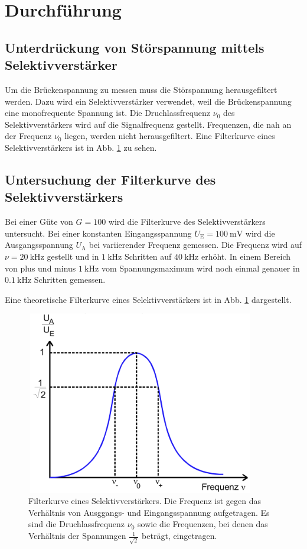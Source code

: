 \section{Durchführung}
\label{sec:Durchführung}

\subsection{Unterdrückung von Störspannung mittels Selektivverstärker}
Um die Brückenspannung zu messen muss die Störspannung herausgefiltert werden. 
Dazu wird ein Selektivverstärker verwendet, weil
die Brückenspannung eine monofrequente Spannung ist. Die Druchlassfrequenz $\nu_0$ des 
Selektivverstärkers wird auf die Signalfrequenz gestellt. 
Frequenzen, die nah an der Frequenz $\nu_0$ liegen, werden nicht herausgefiltert.
Eine Filterkurve eines Selektivverstärkers ist in Abb. \ref{abb:filterkurve} zu sehen.


\subsection{Untersuchung der Filterkurve des Selektivverstärkers}
Bei einer Güte von $G = \num{100}$ wird die Filterkurve des Selektivverstärkers
untersucht. Bei einer konstanten Eingangsspannung $U_\text{E} = \SI{100}{\milli\volt}$
wird die Ausgangsspannung $U_\text{A}$ bei variierender Frequenz gemessen.
Die Frequenz wird auf $\nu = \SI{20}{\kilo\hertz}$ gestellt und in $\SI{1}{\kilo\hertz}$
Schritten auf $\SI{40}{\kilo\hertz}$ erhöht. In einem Bereich von plus und minus 
$\SI{1}{\kilo\hertz}$ vom Spannungsmaximum wird noch einmal genauer in $\SI{0.1}{\kilo\hertz}$
Schritten gemessen.

\noindent Eine theoretische Filterkurve eines Selektivverstärkers ist in Abb. 
\ref{abb:filterkurve} dargestellt.

\begin{figure}
    \centering
    \includegraphics[width=10cm, height=8cm]{build/filterkurve.png}
    \caption{Filterkurve eines Selektivverstärkers. Die Frequenz ist gegen das
    Verhältnis von Ausggangs- und Eingangsspannung aufgetragen. Es sind die
    Druchlassfrequenz $\nu_0$ sowie die Frequenzen, bei denen das Verhältnis der
    Spannungen $\frac{1}{\sqrt{2}}$ beträgt, eingetragen. \cite{V606}}
    \label{abb:filterkurve}
\end{figure}


